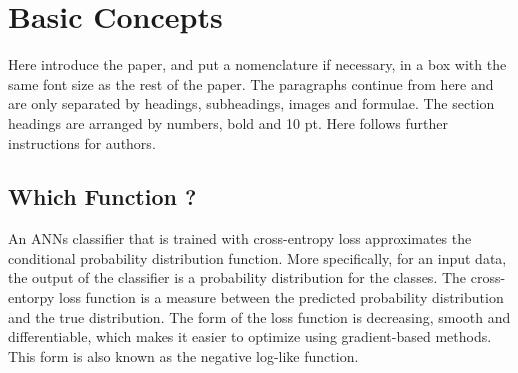 \documentclass[3p,times,procedia]{elsarticle}
\begin{document}



\enlargethispage{10mm}
\section{\textbf{Basic Concepts}}
\label{main}

Here introduce the paper, and put a nomenclature if necessary, in a box with the same font size as the rest of the paper. The paragraphs continue from here and are only separated by headings, subheadings, images and formulae. The section headings are arranged by numbers, bold and 10 pt. Here follows further instructions for authors.


\subsection{\textbf{Which Function ?}}

An ANNs classifier that is trained with cross-entropy loss approximates the conditional probability distribution function.
More specifically, for an input data, the output of the classifier is a probability distribution for the classes.
The cross-entorpy loss function is a measure between the predicted probability distribution and the true distribution.
The form of the loss function is decreasing, smooth and differentiable, which makes it easier to optimize using gradient-based methods.
This form is also known as the negative log-like function.

\end{document}
